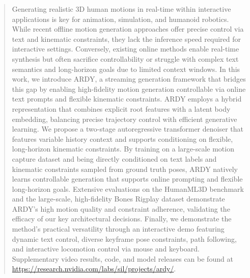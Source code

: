 \begin{abstract}
Generating realistic 3D human motions in real-time within interactive applications is key for animation, simulation, and humanoid robotics.
While recent offline motion generation approaches offer precise control via text and kinematic constraints, they lack the inference speed required for interactive settings. Conversely, existing online methods enable real-time synthesis but often sacrifice controllability or struggle with complex text semantics and long-horizon goals due to limited context windows. 
In this work, we introduce ARDY, a streaming generation framework that bridges this gap by enabling high-fidelity motion generation controllable via online text prompts and flexible kinematic constraints.
ARDY employs a hybrid representation that combines explicit root features with a latent body embedding, balancing precise trajectory control with efficient generative learning.
We propose a two-stage autoregressive transformer denoiser that features variable history context and supports conditioning on flexible, long-horizon kinematic constraints.
By training on a large-scale motion capture dataset and being directly conditioned on text labels and kinematic constraints sampled from ground truth poses, ARDY natively learns controllable generation that supports online prompting and flexible long-horizon goals.
Extensive evaluations on the HumanML3D benchmark and the large-scale, high-fidelity Bones Rigplay dataset demonstrate ARDY's high motion quality and constraint adherence, validating the efficacy of our key architectural decisions.
Finally, we demonstrate the method’s practical versatility through an interactive demo featuring dynamic text control, diverse keyframe pose constraints, path following, and interactive locomotion control via mouse and keyboard.
Supplementary video results, code, and model releases can be found at \url{https://research.nvidia.com/labs/sil/projects/ardy/}.
\end{abstract}
